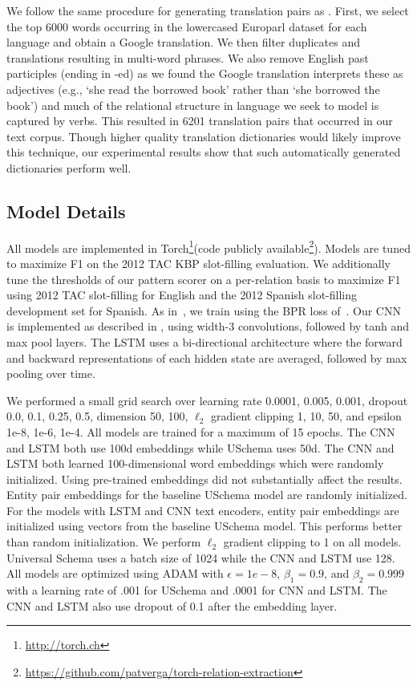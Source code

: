 We follow the same procedure for generating translation pairs as \cite{mikolov2013}.
First, we select the top 6000 words occurring in the lowercased Europarl dataset for each language and obtain a Google translation.
We then filter duplicates and translations resulting in multi-word phrases.
We also remove English past participles (ending in -ed) as we found the Google translation interprets these as adjectives (e.g.,  `she read the borrowed book' rather than `she borrowed the book') and much of the relational structure in language we seek to model is captured by verbs.
This resulted in 6201 translation pairs that occurred in our text corpus.
Though higher quality translation dictionaries would likely improve this technique, our experimental results show that such automatically generated dictionaries perform well.




\subsection {Model Details \label{sec:models}}
All models are implemented in Torch\footnote{\url{http://torch.ch}}(code publicly available\footnote{\url{https://github.com/patverga/torch-relation-extraction}}).
Models are tuned to maximize F1 on the 2012 TAC KBP slot-filling evaluation.
We additionally tune the thresholds of our pattern scorer on a per-relation basis to maximize F1 using 2012 TAC slot-filling for English and the 2012 Spanish slot-filling development set for Spanish.
As in~\citet{limin}, we train using the BPR loss of~\citet{rendle2009bpr}.
Our CNN is implemented as described in \citet{toutanova2015representing}, using width-3 convolutions, followed by tanh and max pool layers.
The LSTM uses a bi-directional architecture where the forward and backward representations of each hidden state are averaged, followed by max pooling over time.

We performed a small grid search over learning rate {0.0001, 0.005, 0.001}, dropout {0.0, 0.1, 0.25, 0.5}, dimension {50, 100}, $\ell_2$ gradient clipping {1, 10, 50}, and epsilon {1e-8, 1e-6, 1e-4}.
All models are trained for a maximum of 15 epochs.
The CNN and LSTM both use 100d embeddings while USchema uses 50d.
The CNN and LSTM both learned 100-dimensional word embeddings which were randomly initialized.
Using pre-trained embeddings did not substantially affect the results.
Entity pair embeddings for the baseline USchema model are randomly initialized.
For the models with LSTM and CNN text encoders, entity pair embeddings are initialized using vectors from the baseline USchema model.
This performs better than random initialization.
We perform $\ell_2$ gradient clipping to 1 on all models.
Universal Schema uses a batch size of 1024 while the CNN and LSTM use 128.
All models are optimized using ADAM \citep{kingma2014adam} with $\epsilon=1e-8$, $\beta_1=0.9$, and $\beta_2=0.999$ with a learning rate of .001 for USchema and .0001 for CNN and LSTM.
The CNN and LSTM also use dropout of 0.1 after the embedding layer.


